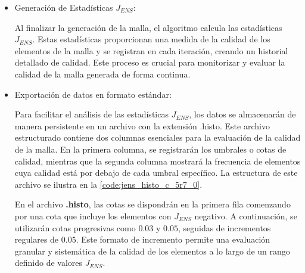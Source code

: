 \begin{itemize}
    \item  Generación de Estadísticas $J_{ENS}$:

    Al finalizar la generación de la malla, el algoritmo calcula las estadísticas $J_{ENS}$. Estas estadísticas proporcionan una medida de la calidad de los elementos de la malla y se registran en cada iteración, creando un historial detallado de calidad. Este proceso es crucial para monitorizar y evaluar la calidad de la malla generada de forma continua.

    \item Exportación de datos en formato estándar:
    

    

Para facilitar el análisis de las estadísticas $J_{ENS}$, los datos se almacenarán de manera persistente en un archivo con la extensión .histo. Este archivo estructurado contiene dos columnas esenciales para la evaluación de la calidad de la malla. En la primera columna, se registrarán los umbrales o cotas de calidad, mientras que la segunda columna mostrará la frecuencia de elementos cuya calidad está por debajo de cada umbral específico. La estructura de este archivo se ilustra en la \autoref{code:jens_histo_c_5r7_0}.

En el archivo \textbf{.histo}, las cotas se dispondrán en la primera fila comenzando por una cota que incluye los elementos con $J_{ENS}$ negativo. A continuación, se utilizarán cotas progresivas como $0.03$ y $0.05$, seguidas de incrementos regulares de $0.05$. Este formato de incremento permite una evaluación granular y sistemática de la calidad de los elementos a lo largo de un rango definido de valores $J_{ENS}$.


\end{itemize}
